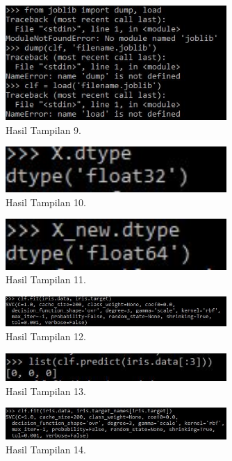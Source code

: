 \begin{figure}[ht]\centerline{\includegraphics[width=0.75\textwidth]{figures/huda/18.JPG}}\caption{Hasil Tampilan 9.}\end{figure}
\begin{figure}[ht]\centerline{\includegraphics[width=0.75\textwidth]{figures/huda/19.JPG}}\caption{Hasil Tampilan 10.}\end{figure}
\begin{figure}[ht]\centerline{\includegraphics[width=0.75\textwidth]{figures/huda/20.JPG}}\caption{Hasil Tampilan 11.}\end{figure}
\begin{figure}[ht]\centerline{\includegraphics[width=0.75\textwidth]{figures/huda/21.JPG}}\caption{Hasil Tampilan 12.}\end{figure}
\begin{figure}[ht]\centerline{\includegraphics[width=0.75\textwidth]{figures/huda/22.JPG}}\caption{Hasil Tampilan 13.}\end{figure}
\begin{figure}[ht]\centerline{\includegraphics[width=0.75\textwidth]{figures/huda/23.JPG}}\caption{Hasil Tampilan 14.}\end{figure}
